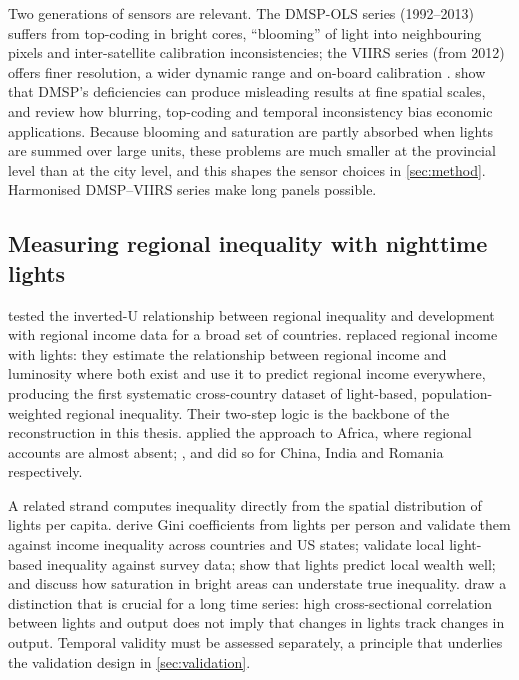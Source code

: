 \documentclass[11pt,a4paper]{article}
\begin{document}
Two generations of sensors are relevant. The DMSP-OLS series (1992--2013) suffers from top-coding in bright cores, ``blooming'' of light into neighbouring pixels and inter-satellite calibration inconsistencies; the VIIRS series (from 2012) offers finer resolution, a wider dynamic range and on-board calibration \citep{Elvidge2021}. \citet{Gibson2021} show that DMSP's deficiencies can produce misleading results at fine spatial scales, and \citet{Gibson2025} review how blurring, top-coding and temporal inconsistency bias economic applications. Because blooming and saturation are partly absorbed when lights are summed over large units, these problems are much smaller at the provincial level than at the city level, and this shapes the sensor choices in \cref{sec:method}. Harmonised DMSP--VIIRS series \citep{Li2020,ChenZ2021} make long panels possible.

\subsection{Measuring regional inequality with nighttime lights}

\citet{Lessmann2014} tested the inverted-U relationship between regional inequality and development with regional income data for a broad set of countries. \citet{LessmannSeidel2017} replaced regional income with lights: they estimate the relationship between regional income and luminosity where both exist and use it to predict regional income everywhere, producing the first systematic cross-country dataset of light-based, population-weighted regional inequality. Their two-step logic is the backbone of the reconstruction in this thesis. \citet{Mveyange2015} applied the approach to Africa, where regional accounts are almost absent; \citet{Wu2018}, \citet{Singhal2020} and \citet{Ivan2020} did so for China, India and Romania respectively.

A related strand computes inequality directly from the spatial distribution of lights per capita. \citet{Mirza2021} derive Gini coefficients from lights per person and validate them against income inequality across countries and US states; \citet{WeidmannTheunissen2021} validate local light-based inequality against survey data; \citet{WeidmannSchutte2017} show that lights predict local wealth well; and \citet{Montalvo2021} discuss how saturation in bright areas can understate true inequality. \citet{Galimberti2023} draw a distinction that is crucial for a long time series: high cross-sectional correlation between lights and output does not imply that changes in lights track changes in output. Temporal validity must be assessed separately, a principle that underlies the validation design in \cref{sec:validation}.
\end{document}
